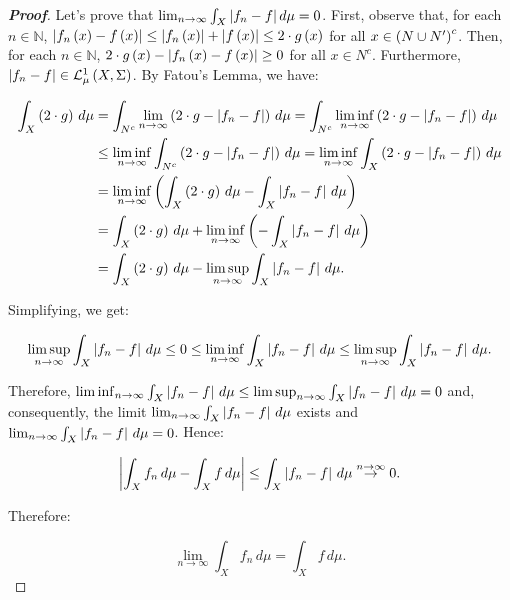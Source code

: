 \begin{theorem}
\begin{proof}[\rm\textbf{Proof}]
    Let's prove that $\lim_{n\to\infty}{\int_{X}{\left|f_n-f\right|}\,d\mu}=0$. First, observe that, for each $n\in\mathbb{N}$, $\left|f_n\left(x\right)-f\left(x\right)\right|\leq\left|f_n\left(x\right)\right|+\left|f\left(x\right)\right|\leq 2\cdot g\left(x\right)$ for all $x\in\left(N\cup N'\right)^c$. Then, for each $n\in\mathbb{N}$, $2\cdot g\left(x\right)-\left|f_n\left(x\right)-f\left(x\right)\right|\geq 0$ for all $x\in N^c$. Furthermore, $\left|f_n-f\right|\in\mathcal{L}^1_{\mu}\left(X,\Sigma\right)$. By Fatou's Lemma, we have:

    \begin{equation}
      \begin{split}
        \int_{X}{\left(2\cdot g\right)\,d\mu} & =\int_{N^c}{\lim_{n\to\infty}{\left(2\cdot g-\left|f_n-f\right|\right)\,d\mu}}=\int_{N^c}{\liminf_{n\to\infty}{\left(2\cdot g-\left|f_n-f\right|\right)\,d\mu}}\\
        & \leq\liminf_{n\to\infty}{\int_{N^c}{\left(2\cdot g-\left|f_n-f\right|\right)\,d\mu}}=\liminf_{n\to\infty}{\int_{X}{\left(2\cdot g-\left|f_n-f\right|\right)\,d\mu}}\\
        & =\liminf_{n\to\infty}{\left(\int_{X}{\left(2\cdot g\right)\,d\mu}-\int_{X}{\left|f_n-f\right|\,d\mu}\right)}\\
        & =\int_{X}{\left(2\cdot g\right)\,d\mu}+\liminf_{n\to\infty}{\left(-\int_{X}{\left|f_n-f\right|\,d\mu}\right)}\\
        & =\int_{X}{\left(2\cdot g\right)\,d\mu}-\limsup_{n\to\infty}{\int_{X}{\left|f_n-f\right|\,d\mu}}.
      \end{split}
    \end{equation}

    Simplifying, we get:

    \begin{equation}
      \limsup_{n\to\infty}{\int_{X}{\left|f_n-f\right|\,d\mu}}\leq 0\leq\liminf_{n\to\infty}{\int_{X}{\left|f_n-f\right|\,d\mu}}\leq\limsup_{n\to\infty}{\int_{X}{\left|f_n-f\right|\,d\mu}}.
    \end{equation}

    Therefore, $\liminf_{n\to\infty}{\int_{X}{\left|f_n-f\right|\,d\mu}}\leq\limsup_{n\to\infty}{\int_{X}{\left|f_n-f\right|\,d\mu}}=0$ and, consequently, the limit $\lim_{n\to\infty}{\int_{X}{\left|f_n-f\right|\,d\mu}}$ exists and $\lim_{n\to\infty}{\int_{X}{\left|f_n-f\right|\,d\mu}}=0$. Hence:

    \begin{equation}
      \left|\int_{X}{f_n\,d\mu}-\int_{X}{f\,d\mu}\right|\leq\int_{X}{\left|f_n-f\right|\,d\mu}\stackrel{n\to\infty}{\rightarrow}0.
    \end{equation}

    Therefore:

    \begin{equation}
      \lim_{n\to\infty}{\int_{X}{f_n\,d\mu}}=\int_{X}{f\,d\mu}.
    \end{equation}
  \end{proof}
\end{theorem}

